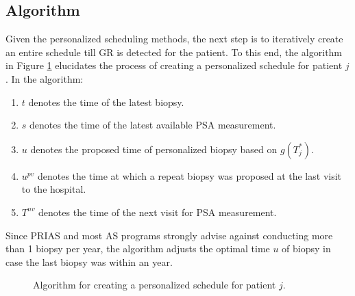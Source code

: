 \subsection{Algorithm}
\label{subsec : pers_sched_algorithm}
Given the personalized scheduling methods, the next step is to iteratively create an entire schedule till GR is detected for the patient. To this end, the algorithm in Figure \ref{fig : sched_algorithm} elucidates the process of creating a personalized schedule for patient $j$. In the algorithm:

\begin{enumerate}
\item $t$ denotes the time of the latest biopsy.
\item $s$ denotes the time of the latest available PSA measurement.
\item $u$ denotes the proposed time of personalized biopsy based on $g(T^*_j)$.
\item $u^{pv}$ denotes the time at which a repeat biopsy was proposed at the last visit to the hospital.
\item $T^{nv}$ denotes the time of the next visit for PSA measurement.
\end{enumerate}
Since PRIAS and most AS programs strongly advise against conducting more than 1 biopsy per year, the algorithm adjusts the optimal time $u$ of biopsy in case the last biopsy was within an year.

\begin{figure}
\centering
\captionsetup{justification=centering}

\caption{Algorithm for creating a personalized schedule for patient $j$.} 
\label{fig : sched_algorithm}
\end{figure}